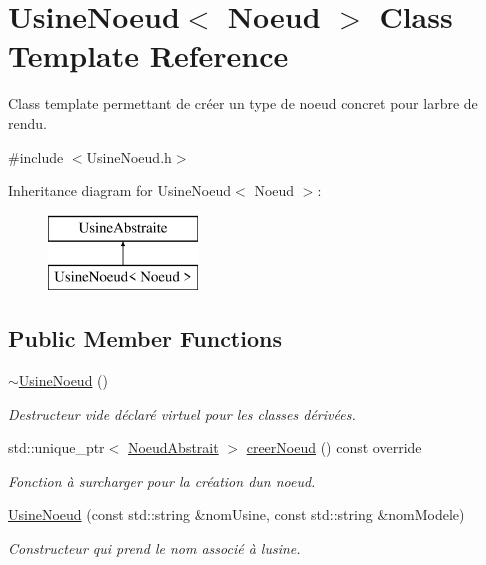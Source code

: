\hypertarget{class_usine_noeud}{}\section{Usine\+Noeud$<$ Noeud $>$ Class Template Reference}
\label{class_usine_noeud}


Class template permettant de créer un type de noeud concret pour l\textquotesingle{}arbre de rendu.  




{\ttfamily \#include $<$Usine\+Noeud.\+h$>$}

Inheritance diagram for Usine\+Noeud$<$ Noeud $>$\+:\begin{figure}[H]
\begin{center}
\leavevmode
\includegraphics[height=2.000000cm]{class_usine_noeud}
\end{center}
\end{figure}
\subsection*{Public Member Functions}
\begin{DoxyCompactItemize}
\item 
\hypertarget{class_usine_noeud_ad09d79d36fb0135b51224484ca0f47f0}{}\hyperlink{class_usine_noeud_ad09d79d36fb0135b51224484ca0f47f0}{$\sim$\+Usine\+Noeud} ()\label{class_usine_noeud_ad09d79d36fb0135b51224484ca0f47f0}

\begin{DoxyCompactList}\small\item\em Destructeur vide déclaré virtuel pour les classes dérivées. \end{DoxyCompactList}\item 
std\+::unique\+\_\+ptr$<$ \hyperlink{class_noeud_abstrait}{Noeud\+Abstrait} $>$ \hyperlink{group__inf2990_gaffd84653b96be43050e5dd25fff10751}{creer\+Noeud} () const  override
\begin{DoxyCompactList}\small\item\em Fonction à surcharger pour la création d\textquotesingle{}un noeud. \end{DoxyCompactList}\item 
\hypertarget{class_usine_noeud_a14ce73da1a318f53746607658837c56a}{}\hyperlink{class_usine_noeud_a14ce73da1a318f53746607658837c56a}{Usine\+Noeud} (const std\+::string \&nom\+Usine, const std\+::string \&nom\+Modele)\label{class_usine_noeud_a14ce73da1a318f53746607658837c56a}

\begin{DoxyCompactList}\small\item\em Constructeur qui prend le nom associé à l\textquotesingle{}usine. \end{DoxyCompactList}\end{DoxyCompactItemize}
